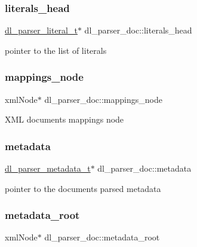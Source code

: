 \subsubsection{\texorpdfstring{literals\+\_\+head}{literals\_head}}
{\footnotesize\ttfamily \hyperlink{datalog__parser_8h_adaef2eede58b9f7698925f7194af1373}{dl\+\_\+parser\+\_\+literal\+\_\+t}$\ast$ dl\+\_\+parser\+\_\+doc\+::literals\+\_\+head}

pointer to the list of literals \mbox{\label{structdl__parser__doc_ab22e9a4005d93564188d786b878786dd}} 
\subsubsection{\texorpdfstring{mappings\+\_\+node}{mappings\_node}}
{\footnotesize\ttfamily xml\+Node$\ast$ dl\+\_\+parser\+\_\+doc\+::mappings\+\_\+node}

X\+ML document\textquotesingle{}s mappings node \mbox{\label{structdl__parser__doc_aed7768f7af6c53d24b4110b8163c8c27}} 
\subsubsection{\texorpdfstring{metadata}{metadata}}
{\footnotesize\ttfamily \hyperlink{datalog__parser_8h_a736cfacf590c4edd0dde10dd9c0880a1}{dl\+\_\+parser\+\_\+metadata\+\_\+t}$\ast$ dl\+\_\+parser\+\_\+doc\+::metadata}

pointer to the documents parsed metadata \mbox{\label{structdl__parser__doc_a08c1f4a9ca83844d75f7caf2a74eec6d}} 
\subsubsection{\texorpdfstring{metadata\+\_\+root}{metadata\_root}}
{\footnotesize\ttfamily xml\+Node$\ast$ dl\+\_\+parser\+\_\+doc\+::metadata\+\_\+root}

